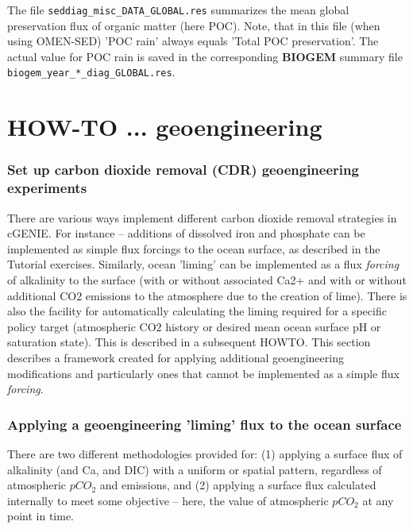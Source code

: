 \documentclass[11pt,fleqn]{book} %
\begin{document}
The file \texttt{seddiag\_misc\_DATA\_GLOBAL.res} summarizes the mean global preservation flux of organic matter (here POC). Note, that in this file (when using OMEN-SED) 'POC rain' always equals 'Total POC preservation'. The actual value for
POC rain is saved in the corresponding \textbf{BIOGEM} summary file \texttt{biogem\_year\_*\_diag\_GLOBAL.res}.


\newpage


\section{HOW-TO ... geoengineering}

\subsubsection{Set up carbon dioxide removal (CDR) geoengineering experiments}

There are various ways implement different carbon dioxide removal strategies in cGENIE. For instance -- additions of dissolved iron and phosphate can be implemented as simple flux forcings to the ocean surface, as described in the Tutorial exercises. Similarly, ocean 'liming'
 can be implemented as a flux \textit{forcing} of alkalinity to the surface (with or without associated Ca2+ and with or without additional CO2 emissions to the atmosphere due to the creation of lime).
There is also the facility for automatically calculating the liming required for a specific policy target (atmospheric CO2 history or desired mean ocean surface pH or saturation state). This is described in a subsequent HOWTO.
This section describes a framework created for applying additional geoengineering modifications and particularly ones that cannot be implemented as a simple flux \textit{forcing}.

%
\subsubsection{Applying a geoengineering 'liming' flux to the ocean surface}
\vspace{1mm}

There are two different methodologies provided for: (1) applying a surface flux of alkalinity (and Ca, and DIC) with a uniform or spatial pattern, regardless of atmospheric \(pCO_{2}\) and emissions, and (2) applying a surface flux calculated internally to meet some objective -- here, the value of atmospheric \(pCO_{2}\) at any point in time.
\end{document}
